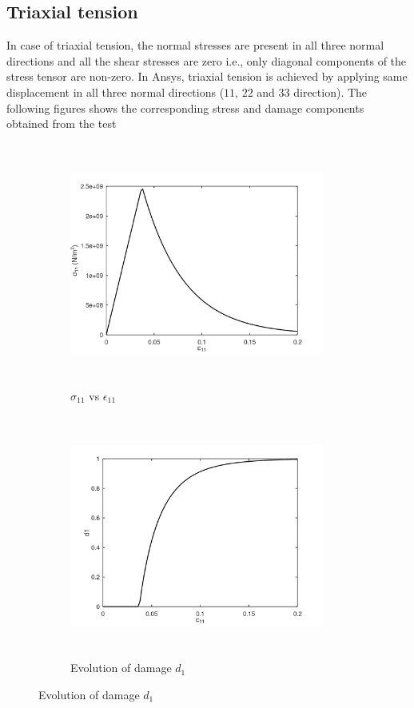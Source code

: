 \documentclass[a4paper,12pt,twoside]{report}
\begin{document}
\subsection{Triaxial tension}
\indent\indent\indent In case of triaxial tension, the normal stresses are present in all three normal directions and all the shear stresses are zero i.e., only diagonal components of the stress tensor are non-zero.  In Ansys, triaxial tension is achieved by applying same displacement in all three normal directions ($11$, $22$ and $33$ direction). The following figures shows the corresponding stress and damage components obtained from the test
\begin{figure}[htbp!]
       \captionsetup[subfigure]{justification=centering}
     \begin{subfigure}{0.4\textwidth}
         \includegraphics[width=8.3cm,height=8cm,keepaspectratio]{24.S11vsE11.png}
         \caption{$\sigma_{11}$ vs $\epsilon_{11}$}
         \label{fig:S11vsE11 2}
     \end{subfigure}
     \hspace{1.8cm}
     \captionsetup[subfigure]{justification=centering}
     \begin{subfigure}{0.4\textwidth}
         \includegraphics[width=8.3cm,height=8cm,keepaspectratio]{24.d1.png}
         \caption{Evolution of damage $d_{1}$}
         \label{fig:Evolution of damage d1 2}
     \end{subfigure}
\end{figure}
\end{document}

